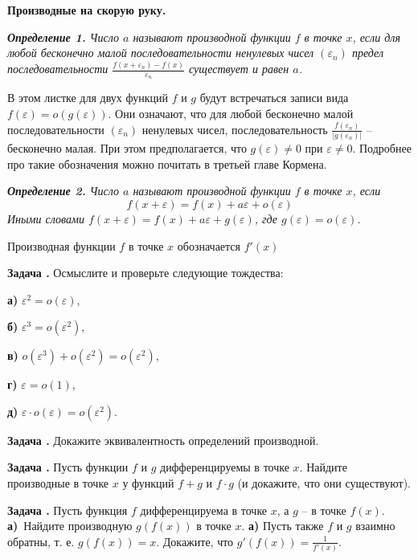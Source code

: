\documentclass[12pt,a4paper]{article}
\newcounter{znum}
\newcommand{\z}[1]{\addtocounter{znum}{1} \textbf{Задача \arabic{znum}#1. }}
\begin{document}
\pagestyle{empty}

\begin{center} \Large \textbf{Производные на скорую руку.}
\end{center}

{\it {\bf Определение 1.} Число $a$ называют производной функции $f$ в точке $x$, если для любой бесконечно малой последовательности ненулевых чисел $(\varepsilon_n)$ предел последовательности $\frac{f(x + \varepsilon_n) - f(x)}{\varepsilon_n}$ существует и равен $a$.}

В этом листке для двух функций $f$ и $g$ будут встречаться записи вида $f(\varepsilon) = o(g(\varepsilon))$. Они означают, что для любой бесконечно малой последовательности $(\varepsilon_n)$ ненулевых чисел, последовательность $\frac{f(\varepsilon_n)}{|g(\varepsilon_n)|}$ -- бесконечно малая. При этом предполагается, что $g(\varepsilon) \ne 0$ при $\varepsilon \ne 0$.
Подробнее про такие обозначения можно почитать в третьей главе Кормена.

{\it {\bf Определение 2.} Число $a$ называют производной функции $f$ в точке $x$, если
$$f(x + \varepsilon) = f(x) + a \varepsilon + o(\varepsilon)$$
Иными словами $f(x + \varepsilon) = f(x) + a \varepsilon + g(\varepsilon)$, где $g(\varepsilon) = o(\varepsilon)$.}

Производная функции $f$ в точке $x$ обозначается $f'(x)$

\z{} Осмыслите и проверьте следующие тождества:\par
\textbf{а)} $\varepsilon^2 = o(\varepsilon)$,\par
\textbf{б)} $\varepsilon^3 = o(\varepsilon^2)$,\par
\textbf{в)} $o(\varepsilon^3) + o(\varepsilon^2) = o(\varepsilon^2)$,\par
\textbf{г)} $\varepsilon = o(1)$,\par
\textbf{д)} $\varepsilon \cdot o(\varepsilon) = o(\varepsilon^2)$.

\z{} Докажите эквивалентность определений производной.

\z{} Пусть функции $f$ и $g$ дифференцируемы в точке $x$. Найдите производные в точке $x$ у функций $f + g$ и $f \cdot g$ (и докажите, что они существуют).

\z{} Пусть функция $f$ дифференцируема в точке $x$, а $g$ -- в точке $f(x)$. \textbf{а)}~Найдите производную $g(f(x))$ в точке $x$. \textbf{а)} Пусть также $f$ и $g$ взаимно обратны, т. е. $g(f(x)) = x$. Докажите, что $g'(f(x)) = \frac{1}{f'(x)}$.
\end{document}
